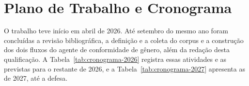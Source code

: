 \chapter{Plano de Trabalho e Cronograma}\label{chap:plano_trabalho}

O trabalho teve início em abril de 2026. Até setembro do mesmo ano foram concluídas a revisão bibliográfica, a definição e a coleta do corpus e a construção dos dois fluxos do agente de conformidade de gênero, além da redação desta qualificação. A Tabela~\ref{tab:cronograma-2026} registra essas atividades e as previstas para o restante de 2026, e a Tabela~\ref{tab:cronograma-2027} apresenta as de 2027, até a defesa.


